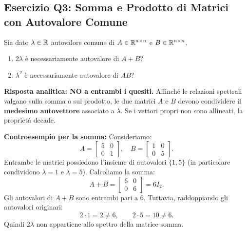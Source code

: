 \subsection{Esercizio Q3: Somma e Prodotto di Matrici con Autovalore Comune}

\begin{example}
\label{ex:q3-somma-prodotto}
Sia dato $\lambda \in \mathbb{R}$ autovalore comune di $A \in \mathbb{R}^{n \times n}$ e $B \in \mathbb{R}^{n \times n}$.
\begin{enumerate}
    \item $2\lambda$ \`e necessariamente autovalore di $A + B$?
    \item $\lambda^2$ \`e necessariamente autovalore di $AB$?
\end{enumerate}

\noindent\textbf{Risposta analitica: NO a entrambi i quesiti.}
Affinch\'e le relazioni spettrali valgano sulla somma o sul prodotto, le due matrici $A$ e $B$ devono condividere il \textbf{medesimo autovettore} associato a $\lambda$. Se i vettori propri non sono allineati, la propriet\`a decade.

\medskip
\noindent\textbf{Controesempio per la somma:}
Consideriamo:
\begin{equation}
    A = \begin{bmatrix} 5 & 0 \\ 0 & 1 \end{bmatrix}, \quad B = \begin{bmatrix} 1 & 0 \\ 0 & 5 \end{bmatrix}.
\end{equation}
Entrambe le matrici possiedono l'insieme di autovalori $\{1, 5\}$ (in particolare condividono $\lambda = 1$ e $\lambda = 5$). Calcoliamo la somma:
\begin{equation}
    A + B = \begin{bmatrix} 6 & 0 \\ 0 & 6 \end{bmatrix} = 6 I_2.
\end{equation}
Gli autovalori di $A + B$ sono entrambi pari a $6$. Tuttavia, raddoppiando gli autovalori originari:
\begin{equation}
    2 \cdot 1 = 2 \neq 6, \qquad 2 \cdot 5 = 10 \neq 6.
\end{equation}
Quindi $2\lambda$ non appartiene allo spettro della matrice somma.


\end{example}
